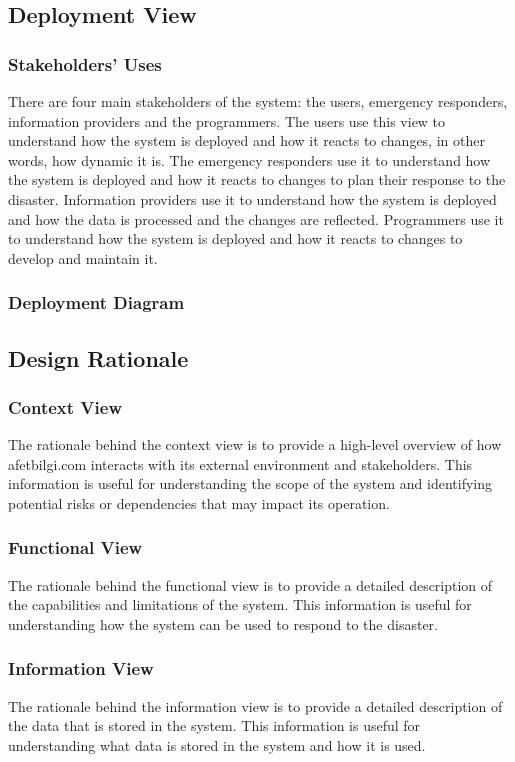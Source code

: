 \documentclass[a4paper]{article}
\begin{document}
    \subsection{Deployment View}
    \subsubsection{Stakeholders' Uses}
    There are four main stakeholders of the system: the users, emergency responders, information providers and the programmers.
    The users use this view to understand how the system is deployed and how it reacts to changes, in other words, how dynamic it is.
    The emergency responders use it to understand how the system is deployed and how it reacts to changes to plan their response
    to the disaster. Information providers use it to understand how the system is deployed and how the data is processed and the
    changes are reflected. Programmers use it to understand how the system is deployed and how it reacts to changes to develop
    and maintain it.
    \subsubsection{Deployment Diagram}
    \subsection{Design Rationale}
    \subsubsection{Context View}
    The rationale behind the context view is to provide a high-level overview of how afetbilgi.com interacts with its external
    environment and stakeholders. This information is useful for understanding the scope of the system and identifying potential
    risks or dependencies that may impact its operation.
    \subsubsection{Functional View}
    The rationale behind the functional view is to provide a detailed description of the capabilities and limitations of the
    system. This information is useful for understanding how the system can be used to respond to the disaster.
    \subsubsection{Information View}
    The rationale behind the information view is to provide a detailed description of the data that is stored in the system.
    This information is useful for understanding what data is stored in the system and how it is used.
\end{document}
